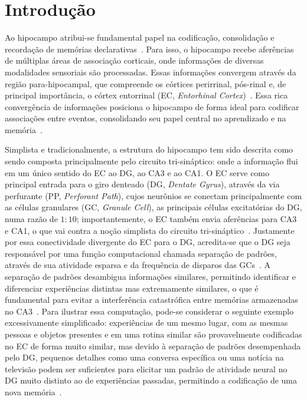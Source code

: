 \chapter{Introdução}

Ao hipocampo atribui-se fundamental papel na codificação, consolidação e recordação de memórias
declarativas~\cite{eichenbaumHippocampus1999, liaoLearning2024}. Para isso, o hipocampo recebe aferências de múltiplas áreas de
associação corticais, onde informações de diversas modalidades sensoriais são processadas. Essas informações convergem através da
região para-hipocampal, que compreende os córtices perirrinal, pós-rinal e, de principal importância, o córtex entorrinal (EC,
\textit{Entorhinal Cortex})~\cite{eichenbaumCortical2000}. Essa rica convergência de informações posiciona o hipocampo de forma
ideal para codificar associações entre eventos, consolidando seu papel central no aprendizado e na memória~\cite{henkeModel2010,
berdugo-vegaSharpening2023}.

Simplista e tradicionalmente, a estrutura do hipocampo tem sido descrita como sendo composta principalmente pelo circuito
tri-sináptico: onde a informação flui em um único sentido do EC ao DG, ao CA3 e ao CA1. O EC serve como principal entrada para o
giro denteado (DG, \textit{Dentate Gyrus}), através da via perfurante (PP, \textit{Perforant Path}), cujos neurônios se conectam
principalmente com as células granulares (GC, \textit{Granule Cell}), as principais células excitatórias do DG, numa razão de
$1:10$; importantemente, o EC também envia aferências para CA3 e CA1, o que vai contra a noção simplista do circuito
tri-sináptico~\cite{basuCorticohippocampal2015}. Justamente por essa conectividade divergente do EC para o DG, acredita-se que o
DG seja responsável por uma função computacional chamada separação de padrões, através de sua atividade esparsa e da frequência de
disparos das GCs~\cite{hainmuellerDentate2020, kesnerMnemonic2006, yassaPattern2011}. A separação de padrões desambigua
informações similares, permitindo identificar e diferenciar experiências distintas mas extremamente similares, o que é fundamental
para evitar a interferência catastrófica entre memórias armazenadas no CA3~\cite{rollsMechanisms2013}. Para ilustrar essa
computação, pode-se considerar o seguinte exemplo excessivamente simplificado: experiências de um mesmo lugar, com as mesmas
pessoas e objetos presentes e em uma rotina similar são provavelmente codificadas no EC de forma muito similar, mas devido à
separação de padrões desempenhada pelo DG, pequenos detalhes como uma conversa específica ou uma notícia na televisão podem ser
suficientes para elicitar um padrão de atividade neural no DG muito distinto ao de experiências passadas, permitindo a codificação
de uma nova memória~\cite{eichenbaumHippocampus2004}.

